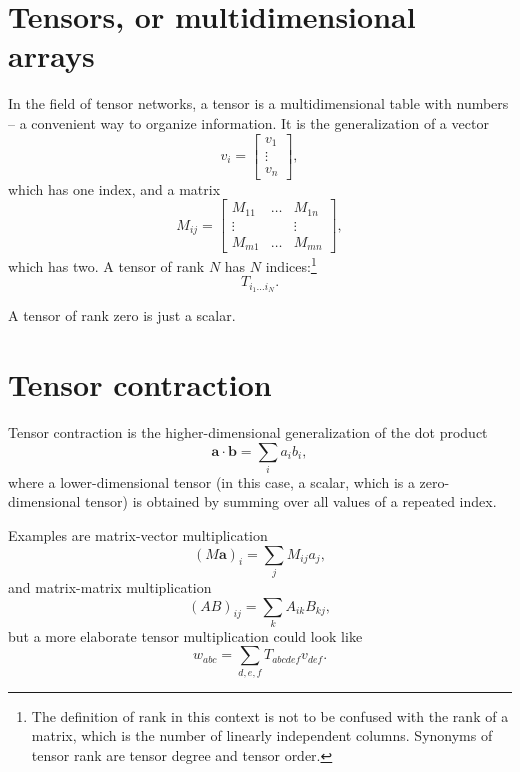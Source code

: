 \section{Tensors, or multidimensional arrays}


In the field of tensor networks, a tensor is a multidimensional table with numbers -- a
convenient way to organize information. It is the generalization of a vector
\begin{equation}
  v_i =
  \begin{bmatrix}
    v_1 \\
    \vdots \\
    v_n
  \end{bmatrix},
\end{equation}
which has one index, and a matrix
\begin{equation}
  M_{i j} =
  \begin{bmatrix}
  M_{1 1} & \dots & M_{1 n} \\
  \vdots  & & \vdots \\
  M_{m 1} & \dots & M_{m n}
  \end{bmatrix},
\end{equation}
which has two.
A tensor of rank $N$ has $N$ indices:\footnote{The definition of rank in this
context is not to be confused with the rank of a matrix, which is the number of
linearly independent columns. Synonyms of tensor rank are tensor degree and
tensor order.}
\begin{equation}
  T_{i_1 \dots i_N}.
\end{equation}

A tensor of rank zero is just a scalar.

\section{Tensor contraction}

Tensor contraction is the higher-dimensional generalization of the dot product
\begin{equation}
  \bm{a} \cdot \bm{b} = \sum_i a_i b_i,
\end{equation}
where a lower-dimensional tensor (in this case, a scalar, which is a
zero-dimensional tensor) is obtained by summing over all values of a repeated
index.

Examples are matrix-vector multiplication
\begin{equation}
  (M \bm{a})_{i} = \sum_j M_{i j} a_j,
\end{equation}
and matrix-matrix multiplication
\begin{equation}
  (A B)_{i j} = \sum_k A_{i k} B_{k j},
\end{equation}
but a more elaborate tensor multiplication could look like
\begin{equation}
  w_{a b c} = \sum_{d, e, f} T_{a b c d e f} v_{d e f}.
\end{equation}

